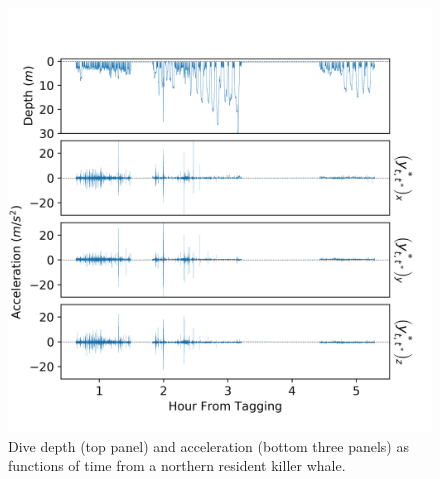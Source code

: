 
\begin{figure}[ht]
	\centering
	\includegraphics[width=5.25in]{../Plots/raw_data.png}
	\caption{Dive depth (top panel) and acceleration (bottom three panels) as functions of time from a northern resident killer whale.}
	\label{fig:data}
\end{figure}

